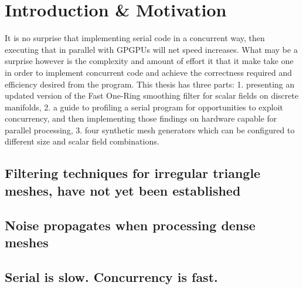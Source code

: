 \chapter{Introduction \& Motivation}
It is no surprise that implementing serial code in a concurrent way, then executing that in parallel with GPGPUs will net speed increases. What may be a surprise however is the complexity and amount of effort it that it make take one in order to implement concurrent code and achieve the correctness required and  efficiency desired from the program. This thesis has three parts: 1. presenting an updated version of the Fast One-Ring smoothing filter for scalar fields on discrete manifolds, 2. a guide to profiling a serial program for opportunities to exploit concurrency, and then implementing those findings on hardware capable for parallel processing, 3. four synthetic mesh generators which can be configured to different size and scalar field combinations.

\section{Filtering techniques for irregular triangle meshes, have not yet been established}
%
\section{Noise propagates when processing dense meshes}

%
%
\section{Serial is slow. Concurrency is fast.}
%
